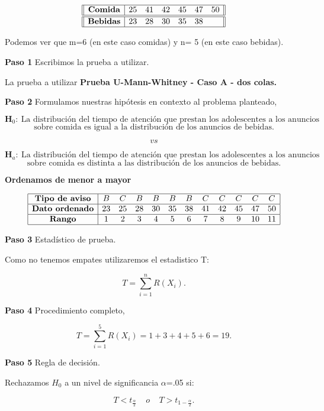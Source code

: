\documentclass[
  a4paper,
  oneside,
  openany]{book}
\begin{document}
\[
\begin{array}{||c| c c c c c c||} 
\hline
\textbf{Comida} & 25 & 41 & 42 & 45 & 47 & 50 \\
\hline\hline
\textbf{Bebidas}& 23 & 28 & 30 & 35 & 38 &  \\ 
\hline
\end{array}
\]

Podemos ver que m=6 (en este caso comidas) y n= 5 (en este caso bebidas).

\textbf{Paso 1} Escribimos la prueba a utilizar.

La prueba a utilizar \textbf{Prueba U-Mann-Whitney - Caso A - dos colas.}

\textbf{Paso 2} Formulamos nuestras hipótesis en contexto al problema planteado,

\[\textbf{H}_0: \ \mbox{La distribución del tiempo de atención que prestan los adolescentes a los 
anuncios}\]
\[\mbox{sobre comida es igual a la distribución de los anuncios de bebidas.}\]

\[vs\]

\[\textbf{H}_a: \ \mbox{La distribución del tiempo de atención que prestan los adolescentes a los anuncios}\]
\[\mbox{sobre comida es distinta a las distribución de los anuncios de bebidas.}\]

\textbf{Ordenamos de menor a mayor}

\[
\begin{array}{ |c| c c c c c c c c c c c| }
\hline
 \textbf{Tipo de aviso} & B & C & B & B & B & B & C & C & C & C & C \\ 
 \hline
 \textbf{Dato ordenado} & 23 & 25 & 28 & 30 & 35 & 38 & 41 & 42 & 45 & 47 & 50 \\ 
 \hline
 \textbf{Rango}         & 1 & 2 & 3 & 4 & 5 & 6 & 7 & 8 & 9 & 10 & 11 \\ 
 \hline
\end{array}
\]

\textbf{Paso 3} Estadístico de prueba.

Como no tenemos empates utilizaremos el estadistico T:

\[T=\sum_{i=1}^{n}R(X_{i}).\]

\textbf{Paso 4} Procedimiento completo,

\[T=\sum_{i=1}^{5}R(X_{i})= 1+3+4+5+6= 19.\]

\textbf{Paso 5} Regla de decisión.

Rechazamos \(H_0\) a un nivel de significancia \(\alpha\)=.05 si:

\[T < t_\frac{\alpha}{2} \ \ \  \ \  o  \ \ \ \ \  T > t_{1-\frac{\alpha}{2}}.\]
\end{document}
